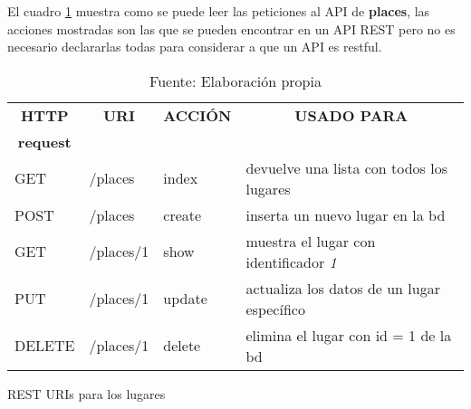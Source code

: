 


  El cuadro \ref{tab:rest} muestra como se puede leer las peticiones al API de \textbf{places}, las acciones mostradas son las que se pueden encontrar en un API REST pero no es necesario declararlas todas para considerar a que un API es restful.\\


  \begin{table}[!hbp]
    \begin{center}

      \begin{tabularx}{0.75\textwidth}{ l l l  X }
        \toprule
        \multicolumn{1}{c}{\textbf{HTTP}} &
        \multicolumn{1}{c}{\textbf{URI}}  &
        \multicolumn{1}{c}{\textbf{ACCI\'ON}} &
        \multicolumn{1}{c}{\textbf{USADO PARA}}  \\
        \multicolumn{1}{c}{\textbf{request}} & & & \\

        \midrule
        GET     &  /places    &  index    & devuelve una lista con todos los lugares\\
        POST    &  /places    &  create   & inserta un nuevo lugar en la bd\\
        GET     &  /places/1  &  show     & muestra el lugar con identificador \emph{1}\\
        PUT     &  /places/1  &  update   & actualiza los datos de un lugar específico\\
        DELETE  &  /places/1  &  delete   & elimina el lugar con id = 1 de la bd\\
        \bottomrule
      \end{tabularx}

      \caption[recursos REST]{REST URIs para los lugares}
      \label{tab:rest}

      \caption*{Fuente: Elaboración propia}
    \end{center}
  \end{table}

